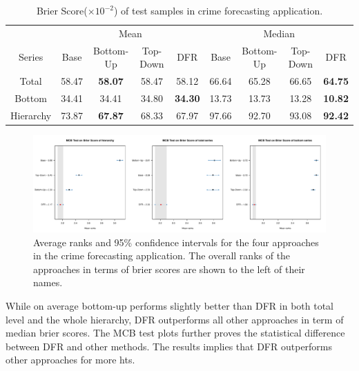 \documentclass[a4paper,review,12pt,authoryear]{elsarticle}
\begin{document}
\begin{table}[h]
  \centering
  \caption{\label{tab:crime_bs} Brier Score($\times 10^{-2}$) of test samples in crime forecasting application.}
  \begin{tabular}{ccccccccc}
  \toprule
  &\multicolumn{4}{c}{Mean} 
  & \multicolumn{4}{c}{Median} \\ \cmidrule(lr){2-5} \cmidrule(lr){6-9}
  Series & Base & Bottom-Up & Top-Down & DFR &  Base & Bottom-Up & Top-Down & DFR \\\midrule
  Total & 58.47 & \textbf{58.07} & 58.47 & 58.12 & 66.64 & 65.28 & 66.65 & \textbf{64.75} \\
  Bottom & 34.41 & 34.41 & 34.80 & \textbf{34.30} & 13.73 & 13.73 & 13.28 & \textbf{10.82}\\
  Hierarchy & 73.87 & \textbf{67.87} & 68.33 & 67.97 & 97.66 & 92.70 & 93.08 & \textbf{92.42}\\
  \bottomrule
  \end{tabular}
  \end{table}

\begin{figure}[h]
  \caption{\label{fig:application_crime}Average ranks and 95\% confidence intervals for the four approaches in the crime forecasting application. The overall ranks of the approaches in terms of brier scores are shown to the left of their names.}
  \centering
  \includegraphics[width=\textwidth]{figures/dc_crime_bs.pdf}
\end{figure}

While on average bottom-up performs slightly better than DFR in both total level and the whole hierarchy, DFR outperforms all other approaches in term of median brier scores.
The MCB test plots further proves the statistical difference between DFR and other methods. 
The results implies that DFR outperforms other approaches for more hts.
\end{document}
